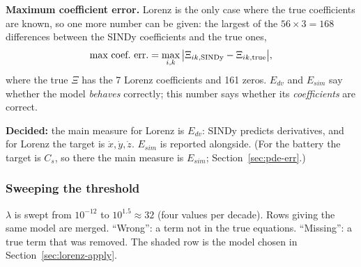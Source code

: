 \documentclass[11pt,a4paper]{article}
\newcommand{\decided}[1]{\textcolor{green!40!black}{\textbf{Decided:} #1}}
\begin{document}
\textbf{Maximum coefficient error.} Lorenz is the only case where the true coefficients are known, so one more number can be given: the largest of the $56\times3=168$ differences between the SINDy coefficients and the true ones,
\[
  \text{max coef.\ err.} = \max_{i,k} \big|\Xi_{ik,\rm SINDy}-\Xi_{ik,\rm true}\big| ,
\]
where the true $\Xi$ has the 7 Lorenz coefficients and 161 zeros. $E_{dv}$ and $E_{sim}$ say whether the model \emph{behaves} correctly; this number says whether its \emph{coefficients} are correct.

\decided{the main measure for Lorenz is $E_{dv}$: SINDy predicts derivatives, and for Lorenz the target is $\dot x,\dot y,\dot z$. $E_{sim}$ is reported alongside. (For the battery the target is $C_s$, so there the main measure is $E_{sim}$; Section~\ref{sec:pde-err}.)}

\subsubsection{Sweeping the threshold}
$\lambda$ is swept from $10^{-12}$ to $10^{1.5}\approx 32$ (four values per decade). Rows giving the same model are merged. ``Wrong'': a term not in the true equations. ``Missing'': a true term that was removed. The shaded row is the model chosen in Section~\ref{sec:lorenz-apply}.

\begin{table}[H]\centering\scriptsize\setlength{\tabcolsep}{4pt}
\resizebox{\textwidth}{!}{}
\caption{Case A, exact derivative. Errors as fractions.}
\end{table}
\begin{table}[H]\centering\scriptsize\setlength{\tabcolsep}{4pt}
\resizebox{\textwidth}{!}{}
\caption{Case C2, 2nd-order finite differences.}
\end{table}
\begin{table}[H]\centering\scriptsize\setlength{\tabcolsep}{4pt}
\resizebox{\textwidth}{!}{}
\caption{Case C4, 4th-order finite differences.}
\end{table}
\end{document}
